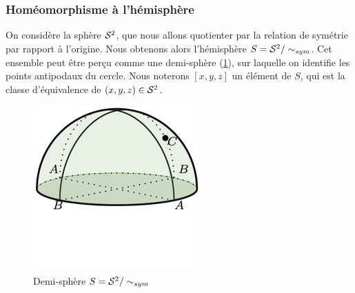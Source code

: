 \documentclass[hidelinks, 10pt]{article}
\begin{document}
\subsubsection{Homéomorphisme à l'hémisphère}

On considère la sphère $\mathcal{S}^{2}$, que nous allons quotienter par la relation de symétrie par rapport à l'origine. Nous obtenons alors l'hémisphère $S=\mathcal{S}^{2}/\sim_{sym}$. Cet ensemble peut être perçu comme une demi-sphère (\ref{fig:sphere-P2R}), sur laquelle on identifie les points antipodaux du cercle. Nous noterons $[x,y,z]$ un élément de $S$, qui est la classe d'équivalence de $(x,y,z)\in \mathcal{S}^{2}$.
\begin{figure}[H]
    \centering
    \includegraphics[width=0.2\linewidth]{pictures/sphere-P2R.png}
    \caption{Demi-sphère $S=\mathcal{S}^{2}/\sim_{sym}$}
    \label{fig:sphere-P2R}
\end{figure}
\end{document}
